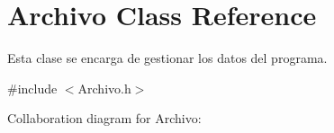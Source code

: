 \hypertarget{classArchivo}{}\section{Archivo Class Reference}
\label{classArchivo}


Esta clase se encarga de gestionar los datos del programa.  




{\ttfamily \#include $<$Archivo.\+h$>$}



Collaboration diagram for Archivo\+:
